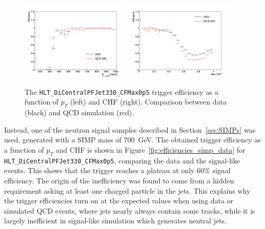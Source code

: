 \begin{figure}[ht]
  \centering
  \includegraphics[width=0.47\textwidth]{figures/trigger/pt_eff_05_DataMC.png}\hfill%
  \includegraphics[width=0.47\textwidth]{figures/trigger/chf_eff_05_DataMC.png}
  \caption{The \texttt{HLT\_DiCentralPFJet330\_CFMax0p5} trigger efficiency as a function of $p_{T}$ (left) and CHF (right). Comparison between data (black) and \ac{QCD} simulation (red). }
  \label{fig:efficiencies_qcd_data}
\end{figure}

Instead, one of the neutron signal samples described in Section~\ref{sec:SIMPs} was used, generated with a \ac{SIMP} mass of \SI{700}{GeV}. The obtained trigger efficiency as a function of $p_{T}$ and CHF is shown in Figure~\ref{fig:efficiencies_simp_data} for \texttt{HLT\_DiCentralPFJet330\_CFMax0p5}, comparing the data and the signal-like events. This shows that the trigger reaches a plateau at only 60\% signal efficiency. The origin of the inefficiency was found to come from a hidden requirement asking at least one charged particle in the jets. This explains why the trigger efficiencies turn on at the expected values when using data or simulated \ac{QCD} events, where jets nearly always contain some tracks, while it is largely inefficient in signal-like simulation which generates neutral jets.

